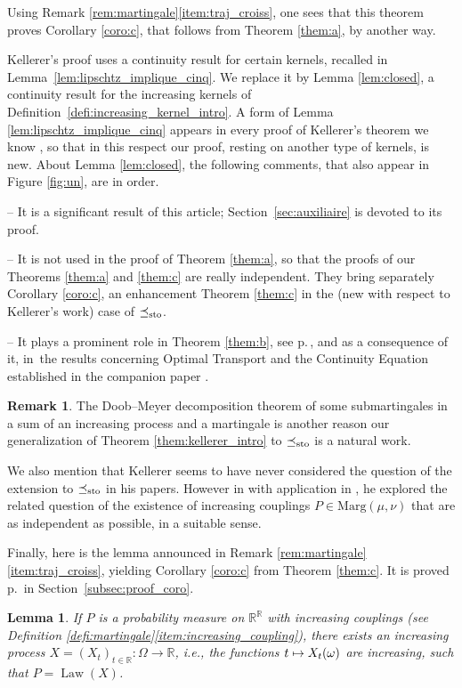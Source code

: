 \documentclass[11pt]{article}
\newcommand{\ie}{i.e.,\xspace}
\newcommand\mto{\mathchoice{\longmapsto}{\mapsto}{\mapsto}{\mapsto}}
\theoremstyle{plain}
\newtheorem{lem}[them]{Lemma}
\theoremstyle{definition}
\newtheorem{rem}[them]{Remark}
\newcommand{\ma}{\mathrm{Marg}}
\newcommand{\R}{\mathbb{R}}
\newcommand{\law}{\operatorname{Law}}
\newcommand{\leqs}{\preceq_{\text{\rm sto}}}
\begin{document}
Using Remark \ref{rem:martingale}\eqref{item:traj_croiss}, one sees that this theorem proves Corollary \ref{coro:c}, that follows from Theorem \ref{them:a}, by another way.

Kellerer's proof uses a continuity result for certain kernels, recalled in Lemma~\ref{lem:lipschtz_implique_cinq}. We replace it by Lemma \ref{lem:closed}, a continuity result for the increasing kernels of Definition~\ref{defi:increasing_kernel_intro}. A form of Lemma \ref{lem:lipschtz_implique_cinq} appears in every proof of Kellerer's theorem we know \cite{Ke72,Ke73,Low,HiRoYo14,BHS}, so that in this respect our proof, resting on another type of kernels, is new. About Lemma \ref{lem:closed}, the following comments, that also appear in Figure \ref{fig:un}, are in order.

-- It is a significant result of this article; Section~\ref{sec:auxiliaire} is devoted to its proof.

-- It is not used in the proof of Theorem \ref{them:a}, so that the proofs of our Theorems \ref{them:a} and \ref{them:c} are really independent. They bring separately Corollary \ref{coro:c}, an enhancement Theorem \ref{them:c} in the (new with respect to Kellerer's work) case of $\leqs$.

-- It plays a prominent role in Theorem \ref{them:b}, see p.\,\pageref{appel_lemme_closed}, and as a consequence of it, in~the results concerning Optimal Transport and the Continuity Equation established in the companion paper \cite{BouJui2}.

\begin{rem}The Doob--Meyer decomposition theorem of some submartingales in a sum of an increasing process and a martingale is another reason our generalization of Theorem \ref{them:kellerer_intro} to $\leqs$ is a natural work.
\end{rem}

We also mention that Kellerer seems to have never considered the question of the extension to $\leqs$ in his papers. However in \cite{Ke86} with application in \cite{Ke87}, he explored the related question of the existence of increasing couplings $P\in \ma(\mu,\nu)$ that are as independent as possible, in a suitable sense.

Finally, here is the lemma announced in Remark \ref{rem:martingale}\eqref{item:traj_croiss}, yielding Corollary \ref{coro:c} from Theorem \ref{them:c}. It is proved p.\,\pageref{subsec:proof_coro} in Section~\ref{subsec:proof_coro}.

\begin{lem}\label{coro}If $P$ is a probability measure on $\R^\R$ with increasing couplings (see Definition \ref{defi:martingale}\eqref{item:increasing_coupling}), there exists an increasing process $X=(X_t)_{t\in\R}:\Omega\to\R$, \ie the functions $t\mto X_t(\omega)$ are increasing, such that $P=\law(X)$.
\end{lem}
\end{document}
